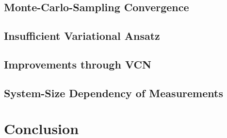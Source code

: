 \documentclass[
headings=optiontohead,              %
12pt,                               %
DIV=13,                             %
twoside=false,                      %
open=right,                         %
BCOR=00mm,                          %
toc=bibliographynumbered            %
]{scrreport}
\begin{document}
    \section{Monte-Carlo-Sampling Convergence}
    \label{sec:experiments-mc-convergence}
    
    \FloatBarrier

    \section{Insufficient Variational Ansatz}
    \label{sec:experiments-vcn-fails}
    
    \FloatBarrier
    
    \section{Improvements through VCN}
    \label{sec:experiments-vcn-successful}
    
    \FloatBarrier

    \section{System-Size Dependency of Measurements}
    \label{sec:experiments-size-dependency-measurement}
    
    \FloatBarrier

\chapter{Conclusion}
\label{sec:conclusion}

\FloatBarrier



\end{document}
